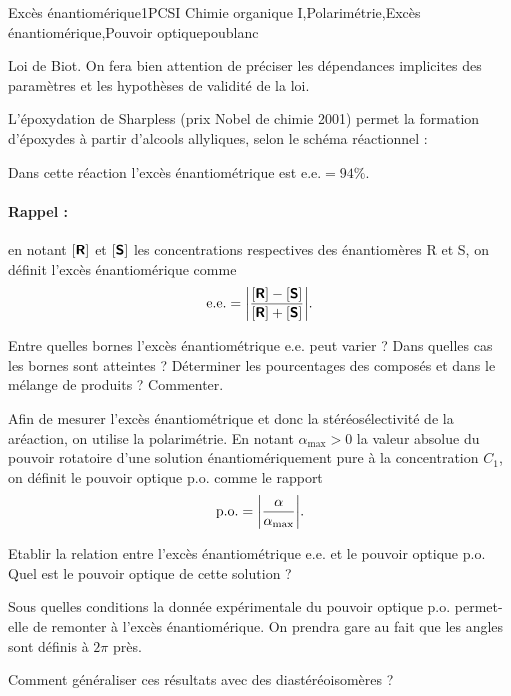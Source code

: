 
\begin{exercise}{Excès énantiomérique}{1}{PCSI}
{Chimie organique I,Polarimétrie,Excès énantiomérique,Pouvoir optique}{poublanc}

\begin{questions}
\questioncours Loi de Biot. On fera bien attention de préciser les dépendances implicites des paramètres et les hypothèses de validité de la loi.

\begin{EnvUplevel}
    L'époxydation de Sharpless (prix Nobel de chimie 2001) permet la formation d'époxydes à partir d'alcools allyliques, selon le schéma réactionnel :
    
    Dans cette réaction l'excès énantiométrique est $\mathrm{e.e.} = 94 \%$.
    
    \paragraph{Rappel :}en notant $[\textbf{\textsf{R}}]$ et $[\textbf{\textsf{S}}]$ les concentrations respectives des énantiomères R et S, on définit l'excès énantiomérique comme
    $$\mathrm{e.e.} = \abs{\dfrac{[\textbf{\textsf{R}}] - [\textbf{\textsf{S}}]}{[\textbf{\textsf{R}}] + [\textbf{\textsf{S}}]}}.$$
\end{EnvUplevel}

\question Entre quelles bornes l'excès énantiométrique $\mathrm{e.e.}$ peut varier ? Dans quelles cas les bornes sont atteintes ?
\question Déterminer les pourcentages des composés  et  dans le mélange de produits ? Commenter.

\begin{EnvUplevel}
    Afin de mesurer l'excès énantiométrique et donc la stéréosélectivité de la aréaction, on utilise la polarimétrie. En notant $\alpha_\text{max} >0$ la valeur absolue du pouvoir rotatoire d'une solution énantiomériquement pure à la concentration $C_1$, on définit le pouvoir optique $\mathrm{p.o.}$ comme le rapport
    $$\mathrm{p.o.} = \abs{\dfrac{\alpha}{\alpha_\text{max}}}.$$
\end{EnvUplevel}

\question Etablir la relation entre l'excès énantiométrique $\mathrm{e.e.}$ et le pouvoir optique $\mathrm{p.o.}$ Quel est le pouvoir optique de cette solution ?


\question Sous quelles conditions la donnée expérimentale du pouvoir optique p.o. permet-elle de remonter à l'excès énantiomérique. On prendra gare au fait que les angles sont définis à $2\pi$ près.

\question Comment généraliser ces résultats avec des diastéréoisomères ?

\end{questions}
\end{exercise}